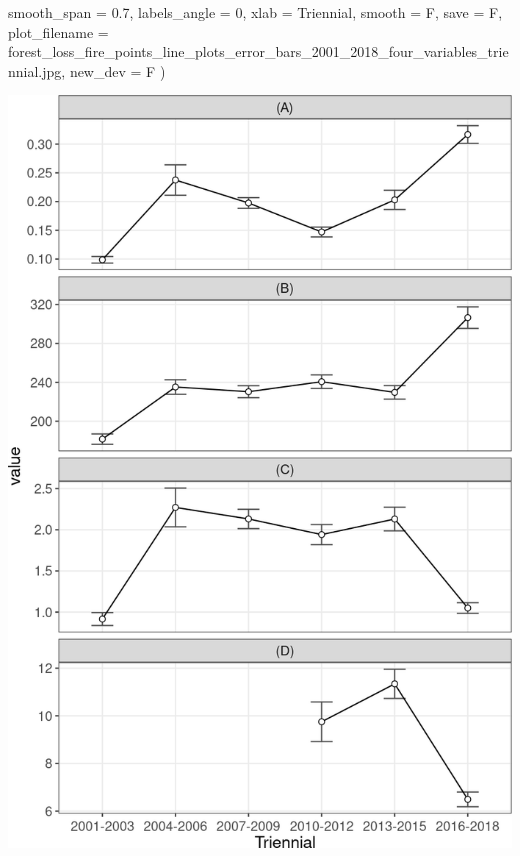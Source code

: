\documentclass[10pt,landscape,a3paper]{article}
\newenvironment{Shaded}{\begin{snugshade}}{\end{snugshade}}
\newcommand{\AttributeTok}[1]{\textcolor[rgb]{0.77,0.63,0.00}{#1}}
\newcommand{\DecValTok}[1]{\textcolor[rgb]{0.00,0.00,0.81}{#1}}
\newcommand{\FloatTok}[1]{\textcolor[rgb]{0.00,0.00,0.81}{#1}}
\newcommand{\NormalTok}[1]{#1}
\newcommand{\StringTok}[1]{\textcolor[rgb]{0.31,0.60,0.02}{#1}}
\begin{document}
\begin{Shaded}
\begin{Highlighting}[]
  \AttributeTok{smooth\_span =} \FloatTok{0.7}\NormalTok{, }\AttributeTok{labels\_angle =} \DecValTok{0}\NormalTok{, }\AttributeTok{xlab =} \StringTok{\textquotesingle{}Triennial\textquotesingle{}}\NormalTok{, }\AttributeTok{smooth =}\NormalTok{ F, }\AttributeTok{save =}\NormalTok{ F,}
  \AttributeTok{plot\_filename =} \StringTok{\textquotesingle{}forest\_loss\_fire\_points\_line\_plots\_error\_bars\_2001\_2018\_four\_variables\_triennial.jpg\textquotesingle{}}\NormalTok{,}
  \AttributeTok{new\_dev =}\NormalTok{ F}
\NormalTok{)}
\end{Highlighting}
\end{Shaded}

\begin{center}\includegraphics{img/modelling/aa-eda-ts-8} \end{center}
\end{document}
